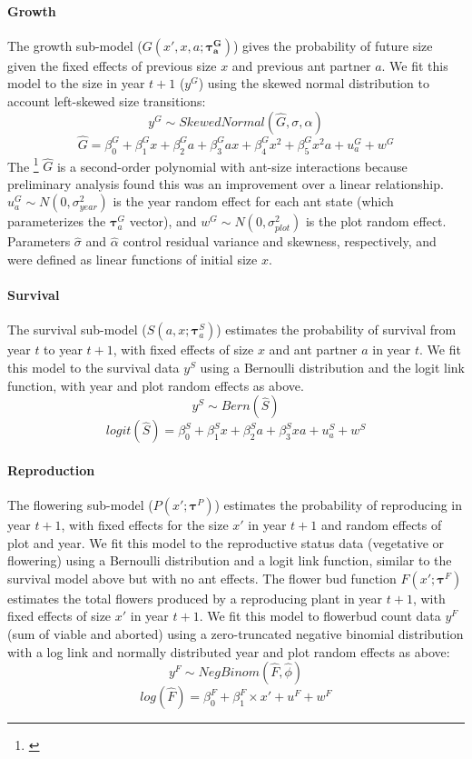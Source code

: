 \documentclass[11pt]{article}
\newcommand{\tom}[2]{{\color{red}{#1}}\footnote{\textit{\color{red}{#2}}}}
\begin{document}
\paragraph{Growth}
The growth sub-model ($G(x',x,a;\pmb{\tau^G_{a}})$) gives the probability of future size given the fixed effects of previous size $x$ and previous ant partner $a$. 
We fit this model to the size in year $t+1$ ($y^G$) using the skewed normal distribution to account left-skewed size transitions:
$$y^G \sim Skewed Normal(\hat{G},\sigma,\alpha) $$
$$\hat{G} = \beta^G_0 + \beta^G_1 x + \beta^G_2 a + \beta^G_3 ax + \beta^G_4 x^2 + \beta^G_5 x^2a + u^G_{a} + w^G $$
The \tom{mean}{I rewrote this for the skewed normal but I cannot remember if the location parameter is the mean, so you should double check this.} $\hat{G}$ is a second-order polynomial with ant-size interactions because  preliminary analysis found this was an improvement over a linear relationship. 
$u^G_{a} \sim N(0,\sigma_{year}^{2})$ is the year random effect for each ant state (which parameterizes the $\pmb{\tau}^G_{a}$ vector), and $w^G \sim N(0,\sigma_{plot}^{2})$ is the plot random effect. 
Parameters $\hat{\sigma}$ and $\hat{\alpha}$  control residual variance and skewness, respectively, and were defined as linear functions of initial size $x$. 

\paragraph{Survival}
The survival sub-model ($S(a,x;\pmb{\tau}_{a}^{S})$) estimates the probability of survival from year $t$ to year $t+1$, with fixed effects of size $x$ and ant partner $a$ in year $t$.
We fit this model to the survival data $y^S$  using a Bernoulli distribution and the logit link function, with year and plot random effects as above. 
$$y^S \sim Bern(\hat{S})$$
$$logit(\hat{S}) = \beta_{0}^{S} + \beta_{1}^{S}  x + \beta_{2}^{S}  a + \beta_{3}^{S}  x  a + u^S_{a} + w^S$$

\paragraph{Reproduction}
The flowering sub-model ($P(x';\pmb{\tau}^{P})$) estimates the probability of reproducing in year $t+1$, with fixed effects for the size $x'$ in year $t+1$ and random effects of plot and year.
We fit this model to the reproductive status data (vegetative or flowering) using a Bernoulli distribution and a logit link function, similar to the survival model above but with no ant effects. 
The flower bud function $F(x';\pmb{\tau}^{F})$ estimates the total flowers produced by a reproducing plant in year $t+1$, with fixed effects of size $x'$ in year $t+1$. 
We fit this model to flowerbud count data $y^F$ (sum of viable and aborted) using a zero-truncated negative binomial distribution with a log link and normally distributed year and plot random effects as above:
$$y^{F} \sim NegBinom(\hat{F},\hat{\phi})$$
$$log(\hat{F}) = \beta_{0}^{F} + \beta_{1}^{F} \times x' + u^F + w^F$$
\end{document}
